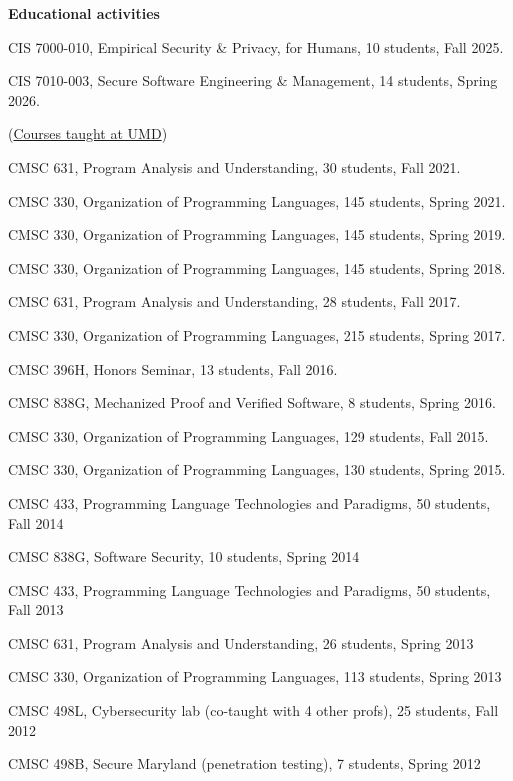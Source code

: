 \documentclass[11pt]{article}
\begin{document}
\begin{description}
\setlength{\labelsep}{0ex}
\setlength{\itemsep}{-0.5ex}

\item {\bf\textsf Educational activities}

\item CIS 7000-010, Empirical Security \& Privacy, for Humans, 10 students, Fall 2025.
\item CIS 7010-003, Secure Software Engineering \& Management, 14 students, Spring 2026.
\item (\underline{Courses taught at UMD})
  \item CMSC 631, Program Analysis and Understanding, 30 students, Fall 2021.
    \item CMSC 330, Organization of Programming Languages, 145 students, Spring 2021.
    \item CMSC 330, Organization of Programming Languages, 145 students, Spring 2019.
    \item CMSC 330, Organization of Programming Languages, 145 students, Spring 2018.
    \item CMSC 631, Program Analysis and Understanding, 28 students, Fall 2017.
    \item CMSC 330, Organization of Programming Languages, 215 students, Spring 2017.
    \item CMSC 396H, Honors Seminar, 13 students, Fall 2016.
    \item CMSC 838G, Mechanized Proof and Verified Software, 8 students, Spring 2016.
    \item CMSC 330, Organization of Programming Languages, 129 students, Fall 2015.
    \item CMSC 330, Organization of Programming Languages, 130 students, Spring 2015.
    \item CMSC 433, Programming Language Technologies and Paradigms, 50 students, Fall 2014
    \item CMSC 838G, Software Security, 10 students, Spring 2014
    \item CMSC 433, Programming Language Technologies and Paradigms, 50 students, Fall 2013
    \item CMSC 631, Program Analysis and Understanding, 26 students, Spring 2013
    \item CMSC 330, Organization of Programming Languages, 113 students, Spring 2013
    \item CMSC 498L, Cybersecurity lab (co-taught with 4 other profs), 25 students, Fall 2012
    \item CMSC 498B, Secure Maryland (penetration testing), 7 students, Spring 2012

\end{description}
\end{document}
